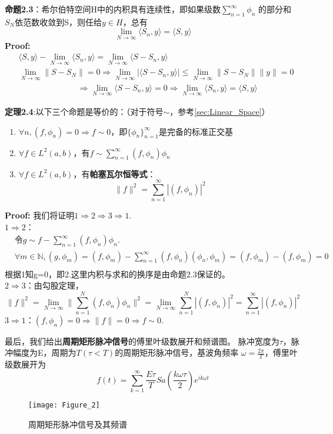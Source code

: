 \documentclass{ctexbook}
\begin{document}
\textbf{命题2.3}：希尔伯特空间H中的内积具有连续性，即如果级数$\sum_{n=1}^{\infty}\phi_n$
的部分和$S_N$依范数收敛到S，则任给$y\in H$，总有
\[\lim_{N\to\infty}\langle S_n,y\rangle=\langle S,y\rangle\]
\textbf{Proof:}\begin{align*}
     & \langle S,y\rangle-\lim_{N\to\infty}\langle S_n,y\rangle=\lim_{N\to\infty}\langle S-S_n,y\rangle                                     \\
     & \lim_{N\to\infty}\|S-S_N\|=0\Rightarrow \lim_{N\to\infty}|\langle S-S_n,y\rangle|\leq\lim_{N\to\infty}\|S-S_N\|\|y\|=0               \\
     & \hspace{3cm}\Rightarrow \lim_{N\to\infty}\langle S-S_n,y\rangle=0\Rightarrow\lim_{N\to\infty}\langle S_n,y\rangle=\langle S,y\rangle
\end{align*}

\textbf{定理2.4}:以下三个命题是等价的：（对于符号$\sim$，参考\ref{sec:Linear_Space}）
\begin{enumerate}
    \item $\forall n,(f,\phi_n)=0\Rightarrow f\sim 0$，即$\{\phi_n\}_{n=1}^{\infty}$是完备的标准正交基
    \item $\forall f\in L^2(a,b)$，有$f\sim\sum_{n=1}^{\infty}(f,\phi_n)\phi_n$
    \item $\forall f\in L^2(a,b)$，有\textbf{帕塞瓦尔恒等式}：
          \[\|f\|^2=\sum_{n=1}^{\infty}|(f,\phi_n)|^2\]
\end{enumerate}
\textbf{Proof:}
我们将证明$1\Rightarrow 2\Rightarrow 3\Rightarrow 1$.\\
$1\Rightarrow 2$：\begin{align*}
     & \text{令}g\sim f-\sum_{n=1}^{\infty}(f,\phi_n)\phi_n.                                                              \\
     & \forall m\in\mathbb{N},(g,\phi_m)=(f,\phi_m)-\sum_{n=1}^{\infty}(f,\phi_n)(\phi_n,\phi_m)=(f,\phi_m)-(f,\phi_m)=0 \\
\end{align*}
根据1知g=0，即2.这里内积与求和的换序是由命题2.3保证的。\\
$2\Rightarrow 3$：由勾股定理，
\[\|f\|^2=\lim_{N\to\infty}\|\sum_{n=1}^{N}(f,\phi_n)\phi_n\|^2=\lim_{N\to\infty}\sum_{n=1}^{N}|(f,\phi_n)|^2=\sum_{n=1}^{\infty}|(f,\phi_n)|^2\]
$3\Rightarrow 1$：$(f,\phi_n)=0\Rightarrow\|f\|=0\Rightarrow f\sim 0$.

最后，我们给出\textbf{周期矩形脉冲信号}的傅里叶级数展开和频谱图。
脉冲宽度为$\tau$，脉冲幅度为E，周期为$T (\tau<T)$的周期矩形脉冲信号，基波角频率
$\omega=\frac{2\pi}{T}$，傅里叶级数展开为
\[f(t)=\sum_{k = 1}^{\infty}  \frac{E\tau}{T}Sa(\frac{k\omega \tau}{2})e^{ik\omega t}\]
\begin{figure}[H]
    \centering
    \texttt{[image: Figure\_2]}\label{fig:2.1}
    \caption{周期矩形脉冲信号及其频谱}
\end{figure}
\end{document}
